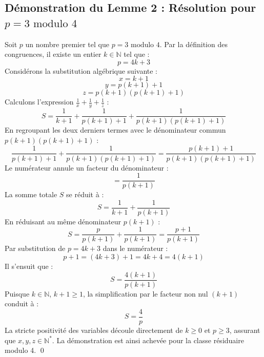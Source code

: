 \documentclass[12pt, a4paper]{article}
\begin{document}
\newpage
\subsection{D\'emonstration du Lemme 2 : R\'esolution pour $p = 3 \text{ modulo } 4$}
Soit $p$ un nombre premier tel que $p = 3 \text{ modulo } 4$.
Par la d\'efinition des congruences, il existe un entier $k \in \mathbb{N}$ tel que :
\begin{equation}
p = 4k + 3
\end{equation}
Consid\'erons la substitution alg\'ebrique suivante :
\begin{equation}
x = k+1
\end{equation}
\begin{equation}
y = p(k+1)+1
\end{equation}
\begin{equation}
z = p(k+1)(p(k+1)+1)
\end{equation}
Calculons l'expression $\frac{1}{x} + \frac{1}{y} + \frac{1}{z}$ :
\begin{equation}
S = \frac{1}{k+1} + \frac{1}{p(k+1)+1} + \frac{1}{p(k+1)(p(k+1)+1)}
\end{equation}
En regroupant les deux derniers termes avec le d\'enominateur commun $p(k+1)(p(k+1)+1)$ :
\begin{equation}
\frac{1}{p(k+1)+1} + \frac{1}{p(k+1)(p(k+1)+1)} = \frac{p(k+1) + 1}{p(k+1)(p(k+1)+1)}
\end{equation}
Le num\'erateur annule un facteur du d\'enominateur :
\begin{equation}
= \frac{1}{p(k+1)}
\end{equation}
La somme totale $S$ se r\'eduit \`a :
\begin{equation}
S = \frac{1}{k+1} + \frac{1}{p(k+1)}
\end{equation}
En r\'eduisant au m\^eme d\'enominateur $p(k+1)$ :
\begin{equation}
S = \frac{p}{p(k+1)} + \frac{1}{p(k+1)} = \frac{p+1}{p(k+1)}
\end{equation}
Par substitution de $p = 4k+3$ dans le num\'erateur :
\begin{equation}
p+1 = (4k+3) + 1 = 4k+4 = 4(k+1)
\end{equation}
Il s'ensuit que :
\begin{equation}
S = \frac{4(k+1)}{p(k+1)}
\end{equation}
Puisque $k \in \mathbb{N}$, $k+1 \ge 1$, la simplification par le facteur non nul $(k+1)$ conduit \`a :
\begin{equation}
S = \frac{4}{p}
\end{equation}
La stricte positivit\'e des variables d\'ecoule directement de $k \ge 0$ et $p \ge 3$, assurant que $x, y, z \in \mathbb{N}^*$.
La d\'emonstration est ainsi achev\'ee pour la classe r\'esiduaire modulo 4. \qed
\end{document}
